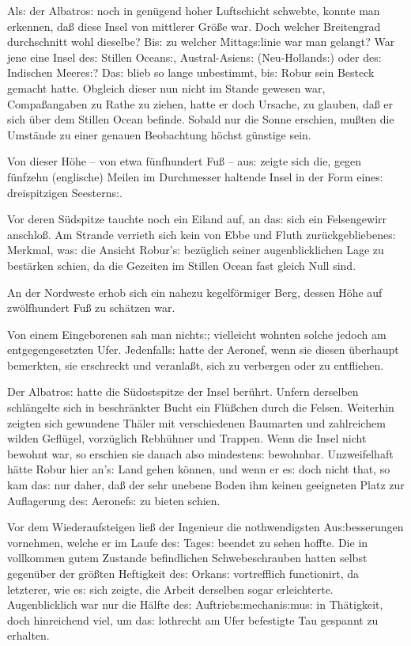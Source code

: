 \documentclass[oneside,12pt]{book}
\newcommand{\s}{s:}
\begin{document}
Al{\s} der {\glqq}Albatro{\s}{\grqq} noch in gen\"ugend hoher Luftschicht
schwebte, konnte man erkennen, da{\ss} diese Insel von mittlerer
Gr\"o{\ss}e war. Doch welcher Breitengrad durchschnitt wohl dieselbe?
Bi{\s} zu welcher Mittag{\s}linie war man gelangt? War jene eine
Insel de{\s} Stillen Ocean{\s}, Austral-Asien{\s} (Neu-Holland{\s})
oder de{\s} Indischen Meere{\s}? Da{\s} blieb so lange unbestimmt,
bi{\s} Robur sein Besteck gemacht hatte. Obgleich dieser nun nicht im
Stande gewesen war, Compa{\ss}angaben zu Rathe zu ziehen, hatte er
doch Ursache, zu glauben, da{\ss} er sich \"uber dem Stillen Ocean
befinde. Sobald nur die Sonne erschien, mu{\ss}ten die Umst\"ande zu
einer genauen Beobachtung h\"ochst g\"unstige sein.

Von dieser H\"ohe -- von etwa f\"unfhundert Fu{\ss} -- au{\s} zeigte
sich die, gegen f\"unfzehn (englische) Meilen im Durchmesser haltende
Insel in der Form eine{\s} dreispitzigen Seestern{\s}.

Vor deren S\"udspitze tauchte noch ein Eiland auf, an da{\s} sich ein
Felsengewirr anschlo{\ss}. Am Strande verrieth sich kein von Ebbe und
Fluth zur\"uckgebliebene{\s} Merkmal, wa{\s} die Ansicht Robur'{\s}
bez\"uglich seiner augenblicklichen Lage zu best\"arken schien, da
die Gezeiten im Stillen Ocean fast gleich Null sind.

An der Nordweste erhob sich ein nahezu kegelf\"ormiger Berg, dessen
H\"ohe auf zw\"olfhundert Fu{\ss} zu sch\"atzen war.

Von einem Eingeborenen sah man nicht{\s}; vielleicht wohnten solche
jedoch am entgegengesetzten Ufer. Jedenfall{\s} hatte der Aeronef,
wenn sie diesen \"uberhaupt bemerkten, sie erschreckt und
veranla{\ss}t, sich zu verbergen oder zu entfliehen.

Der {\glqq}Albatro{\s}{\grqq} hatte die S\"udostspitze der Insel
ber\"uhrt. Unfern derselben schl\"angelte sich in beschr\"ankter
Bucht ein Fl\"u{\ss}chen durch die Felsen. Weiterhin zeigten sich
gewundene Th\"aler mit verschiedenen Baumarten und zahlreichem wilden
Gefl\"ugel, vorz\"uglich Rebh\"uhner und Trappen. Wenn die Insel
nicht bewohnt war, so erschien sie danach also mindesten{\s}
bewohnbar. Unzweifelhaft h\"atte Robur hier an'{\s} Land gehen
k\"onnen, und wenn er e{\s} doch nicht that, so kam da{\s} nur daher,
da{\ss} der sehr unebene Boden ihm keinen geeigneten Platz zur
Auflagerung de{\s} Aeronef{\s} zu bieten schien.

Vor dem Wiederaufsteigen lie{\ss} der Ingenieur die nothwendigsten
Au{\s}besserungen vornehmen, welche er im Laufe de{\s} Tage{\s}
beendet zu sehen hoffte. Die in vollkommen gutem Zustande
befindlichen Schwebeschrauben hatten selbst gegen\"uber der
gr\"o{\ss}ten Heftigkeit de{\s} Orkan{\s} vortrefflich functionirt,
da letzterer, wie e{\s} sich zeigte, die Arbeit derselben sogar
erleichterte. Augenblicklich war nur die H\"alfte de{\s}
Auftrieb{\s}mechani{\s}mu{\s} in Th\"atigkeit, doch hinreichend viel,
um da{\s} lothrecht am Ufer befestigte Tau gespannt zu erhalten.
\end{document}
